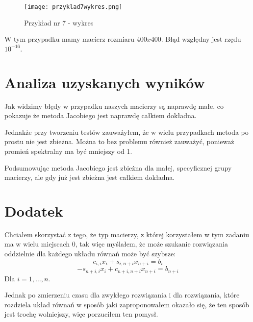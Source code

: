 \documentclass{article}
\begin{document}
\begin{figure}[H]
  \caption{Przykład nr 7 - wykres}
  \centering
  \texttt{[image: przyklad7wykres.png]}
\end{figure}

W tym przypadku mamy macierz rozmiaru \(400x400\). Błąd względny jest rzędu \(10^{-16}\).

\section{Analiza uzyskanych wyników}

Jak widzimy błędy w przypadku naszych macierzy są naprawdę małe, co pokazuje że metoda Jacobiego jest naprawdę całkiem dokładna.

Jednakże przy tworzeniu testów zauważyłem, że w wielu przypadkach metoda po prostu nie jest zbieżna. Można to bez problemu również zauważyć, ponieważ promień spektralny ma być mniejszy od 1. 

Podsumowując metoda Jacobiego jest zbieżna dla małej, specyficznej grupy macierzy, ale gdy już jest zbieżna jest całkiem dokładna.

\section{Dodatek}

Chciałem skorzystać z tego, że typ macierzy, z której korzystałem w tym zadaniu ma w wielu miejscach 0, tak więc myślałem, że może szukanie rozwiązania oddzielnie dla każdego układu równań może być szybsze:
\[c_{i,i}x_i+s_{i,n+i}x_{n+i}=b_i\]
\[-s_{n+i,i}x_i+c_{n+i,n+i}x_{n+i}=b_{n+i}\]
Dla \(i=1,\dots,n\).

Jednak po zmierzeniu czasu dla zwykłego rozwiązania i dla rozwiązania, które rozdziela układ równań w sposób jaki zaproponowałem okazało się, że ten sposób jest trochę wolniejszy, więc porzuciłem ten pomysł. 
\end{document}
